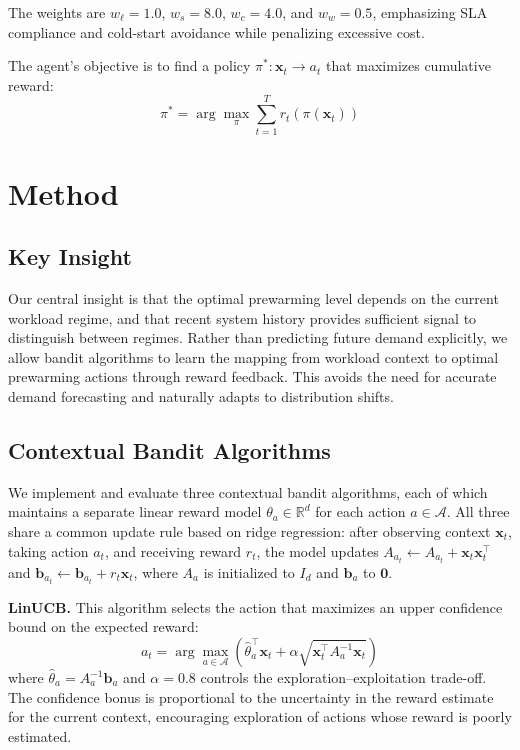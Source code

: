 \documentclass[11pt]{article}
\begin{document}
The weights are $w_\ell = 1.0$, $w_s = 8.0$, $w_c = 4.0$, and $w_w = 0.5$, emphasizing SLA compliance and cold-start avoidance while penalizing excessive cost.

The agent's objective is to find a policy $\pi^* : \mathbf{x}_t \rightarrow a_t$ that maximizes cumulative reward:
\begin{equation}
    \pi^* = \arg\max_\pi \sum_{t=1}^{T} r_t\!\left(\pi(\mathbf{x}_t)\right)
\end{equation}

\section{Method}

\subsection{Key Insight}

Our central insight is that the optimal prewarming level depends on the current workload regime, and that recent system history provides sufficient signal to distinguish between regimes. Rather than predicting future demand explicitly, we allow bandit algorithms to learn the mapping from workload context to optimal prewarming actions through reward feedback. This avoids the need for accurate demand forecasting and naturally adapts to distribution shifts.

\subsection{Contextual Bandit Algorithms}

We implement and evaluate three contextual bandit algorithms, each of which maintains a separate linear reward model $\theta_a \in \mathbb{R}^d$ for each action $a \in \mathcal{A}$. All three share a common update rule based on ridge regression: after observing context $\mathbf{x}_t$, taking action $a_t$, and receiving reward $r_t$, the model updates $A_{a_t} \leftarrow A_{a_t} + \mathbf{x}_t \mathbf{x}_t^\top$ and $\mathbf{b}_{a_t} \leftarrow \mathbf{b}_{a_t} + r_t \mathbf{x}_t$, where $A_a$ is initialized to $I_d$ and $\mathbf{b}_a$ to $\mathbf{0}$.

\textbf{LinUCB.} This algorithm selects the action that maximizes an upper confidence bound on the expected reward:
\begin{equation}
    a_t = \arg\max_{a \in \mathcal{A}} \left( \hat{\theta}_a^\top \mathbf{x}_t + \alpha \sqrt{\mathbf{x}_t^\top A_a^{-1} \mathbf{x}_t} \right)
\end{equation}
where $\hat{\theta}_a = A_a^{-1} \mathbf{b}_a$ and $\alpha = 0.8$ controls the exploration--exploitation trade-off. The confidence bonus is proportional to the uncertainty in the reward estimate for the current context, encouraging exploration of actions whose reward is poorly estimated.
\end{document}
